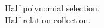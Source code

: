 \documentclass[preview]{standalone}
\begin{document}
Half polynomial selection.\\Half relation collection.\\
\end{document}
